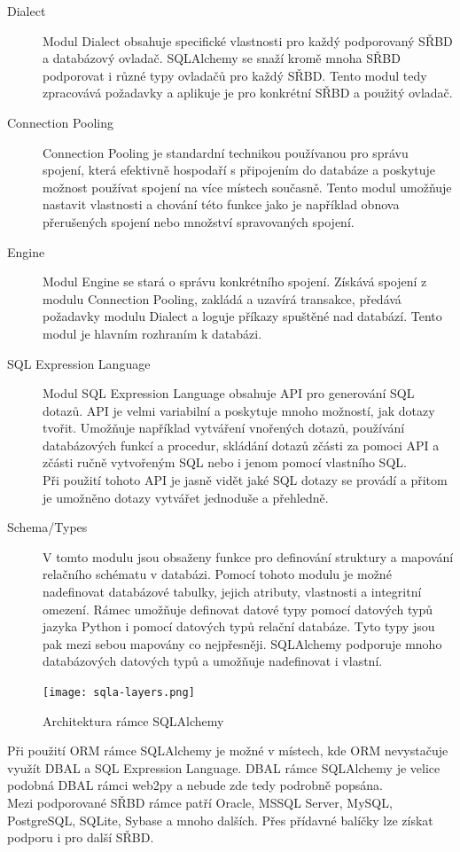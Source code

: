 \documentclass[ing,male,java,dept456]{diploma}						%
\begin{document}
\begin{description}
\item[Dialect] Modul Dialect obsahuje specifické vlastnosti pro každý podporovaný SŘBD a databázový ovladač. SQLAlchemy se snaží kromě mnoha SŘBD podporovat i různé typy ovladačů pro každý SŘBD. Tento modul tedy zpracovává požadavky a aplikuje je pro konkrétní SŘBD a použitý ovladač.
\item[Connection Pooling] Connection Pooling je standardní technikou používanou pro správu spojení, která efektivně hospodaří s připojením do databáze a poskytuje možnost používat spojení na více místech současně. Tento modul umožňuje nastavit vlastnosti a chování této funkce jako je například obnova přerušených spojení nebo množství spravovaných spojení.
\item[Engine] Modul Engine se stará o správu konkrétního spojení. Získává spojení z modulu Connection Pooling, zakládá a uzavírá transakce, předává požadavky modulu Dialect a loguje příkazy spuštěné nad databází. Tento modul je hlavním rozhraním k databázi.
\item[SQL Expression Language] Modul SQL Expression Language obsahuje API pro generování SQL dotazů. API je velmi variabilní a poskytuje mnoho možností, jak dotazy tvořit. Umožňuje například vytváření vnořených dotazů, používání databázových funkcí a procedur, skládání dotazů zčásti za pomoci API a zčásti ručně vytvořeným SQL nebo i jenom pomocí vlastního SQL. \\
Při použití tohoto API je jasně vidět jaké SQL dotazy se provádí a přitom je umožněno dotazy vytvářet jednoduše a přehledně.
\item[Schema/Types] V tomto modulu jsou obsaženy funkce pro definování struktury a mapování relačního schématu v databázi. Pomocí tohoto modulu je možné nadefinovat databázové tabulky, jejich atributy, vlastnosti a integritní omezení. Rámec umožňuje definovat datové typy pomocí datových typů jazyka Python i pomocí datových typů relační databáze. Tyto typy jsou pak mezi sebou mapovány co nejpřesněji. SQLAlchemy podporuje mnoho databázových datových typů a umožňuje nadefinovat i vlastní.
\end{description}

\begin{figure}[h!]
    \centering
    \texttt{[image: sqla-layers.png]}
    \caption{Architektura rámce SQLAlchemy \cite[str. 3]{sqla-doc}}
    \label{fig:sqla-layers}
\end{figure}

Při použití ORM rámce SQLAlchemy je možné v místech, kde ORM nevystačuje využít DBAL a SQL Expression Language. DBAL rámce SQLAlchemy je velice podobná DBAL rámci web2py a nebude zde tedy podrobně popsána. \\
Mezi podporované SŘBD rámce patří Oracle, MSSQL Server, MySQL, PostgreSQL, SQLite, Sybase a mnoho dalších. Přes přídavné balíčky lze získat podporu i pro další SŘBD.
\end{document}
